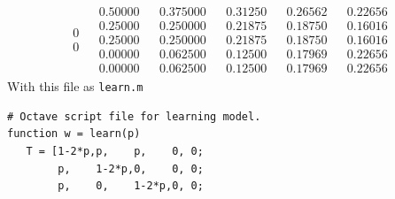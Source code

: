 \begin{exercises}
\begin{answer}
\begin{exparts}
\begin{equation*}
\begin{array}{cc|ccccc}
\begin{array}{c}
               0 \\
               0
            \end{array}
            &\begin{array}{c}
              0.50000 \\
              0.25000 \\
              0.25000 \\
              0.00000 \\
              0.00000
            \end{array}
            &\begin{array}{c}
              0.375000 \\
              0.250000 \\
              0.250000 \\
              0.062500 \\
              0.062500
            \end{array}
            &\begin{array}{c}
              0.31250 \\
              0.21875 \\
              0.21875 \\
              0.12500 \\
              0.12500
            \end{array}
            &\begin{array}{c}
              0.26562 \\
              0.18750 \\
              0.18750 \\
              0.17969 \\
              0.17969
            \end{array}
            &\begin{array}{c}
              0.22656 \\
              0.16016 \\
              0.16016 \\
              0.22656 \\
              0.22656
            \end{array}
          \end{array}
        \end{equation*}
       \partsitem With this file as \texttt{learn.m}
\begin{lstlisting}
# Octave script file for learning model.
function w = learn(p)
   T = [1-2*p,p,    p,    0, 0;
        p,    1-2*p,0,    0, 0;  
        p,    0,    1-2*p,0, 0;

\end{lstlisting}
\end{exparts}
\end{answer}
\end{exercises}
